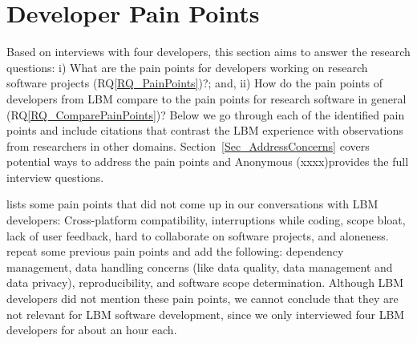 \documentclass[final, 3p, times, authoryear]{elsarticle}
\newcommand{\rqref}[1]{RQ\ref{#1}}
\begin{document}
\section{Developer Pain Points} \label{painpoints}

Based on interviews with four developers, this section aims to answer the
research questions: i) What are the pain points for developers working on
research software projects (\rqref{RQ_PainPoints})?; and, ii) How do the pain
points of developers from LBM compare to the pain points for research software
in general (\rqref{RQ_ComparePainPoints})?  Below we go through each of the
identified pain points and include citations that contrast the LBM experience
with observations from researchers in other domains.
Section~\ref{Sec_AddressConcerns} covers potential ways to address the pain
points and Anonymous (xxxx)\footnotemark[1] %
provides the full interview questions.

\citet{PintoEtAl2018} lists some pain points that did not come up in our
conversations with LBM developers: Cross-platform compatibility, interruptions
while coding, scope bloat, lack of user feedback, hard to collaborate on
software projects, and aloneness. \citet{WieseEtAl2019} repeat some previous
pain points and add the following: dependency management, data handling concerns
(like data quality, data management and data privacy), reproducibility, and
software scope determination. Although LBM developers did not mention these pain
points, we cannot conclude that they are not relevant for LBM software
development, since we only interviewed four LBM developers for about an hour
each.
\end{document}
